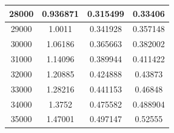\begin{center}
\begin{tabular}{| c | c | c | c |}
28000 & 0.936871 & 0.315499 & 0.33406 \\ \hline
29000 & 1.0011 & 0.341928 & 0.357148 \\ \hline
30000 & 1.06186 & 0.365663 & 0.382002 \\ \hline
31000 & 1.14096 & 0.389944 & 0.411422 \\ \hline
32000 & 1.20885 & 0.424888 & 0.43873 \\ \hline
33000 & 1.28216 & 0.441153 & 0.46848 \\ \hline
34000 & 1.3752 & 0.475582 & 0.488904 \\ \hline
35000 & 1.47001 & 0.497147 & 0.52555 \\ \hline
\hline
\end{tabular}
\end{center}
